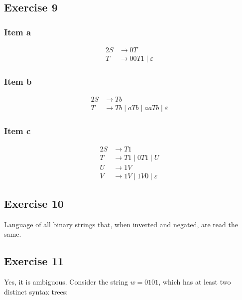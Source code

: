 {\subsection{Exercise 9}
\subsubsection{Item a}
\begin{alignat*}{2}
	S &\rightarrow 0T \\
	T &\rightarrow 00T1\mid \varepsilon
\end{alignat*}
\subsubsection{Item b}
\begin{alignat*}{2}
	S &\rightarrow Tb \\
	T &\rightarrow Tb\mid aTb\mid aaTb\mid \varepsilon
\end{alignat*}
\subsubsection{Item c}
\begin{alignat*}{2}
	S &\rightarrow T1 \\
	T &\rightarrow T1\mid 0T1\mid U \\
	U &\rightarrow 1V \\
	V &\rightarrow 1V\mid 1V0\mid \varepsilon
\end{alignat*}
\subsection{Exercise 10}
Language of all binary strings that, when inverted and negated, are read the same.
\subsection{Exercise 11}
Yes, it is ambiguous. Consider the string $w=0101$, which has at least two distinct syntax trees:\\
\begin{minipage}[t]{0.49\textwidth}
\begin{center}
\end{center}
\end{minipage}%
\begin{minipage}[t]{0.49\textwidth}
\begin{center}
\end{center}
\end{minipage}
}
